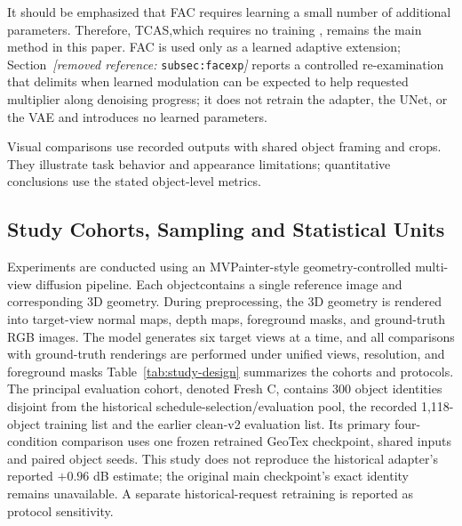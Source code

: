 \documentclass[times,twocolumn,final]{elsarticle}
\providecommand{\DIFadd}[1]{{\protect\color{blue} \sf #1}} %
\providecommand{\DIFdel}[1]{{\protect\color{red} \scriptsize #1}} %
\providecommand{\DIFaddbegin}{} %
\providecommand{\DIFaddend}{} %
\providecommand{\DIFdelbegin}{} %
\providecommand{\DIFdelend}{} %
\begin{document}
\DIFdel{It should be emphasized that FAC requires learning a small number of additional parameters. Therefore, TCAS,which requires no training , remains the main method in this paper. FAC is used only as a learned adaptive extension; Section~\textit{[removed reference: }\texttt{subsec:facexp}\textit{]} reports a controlled re-examination that delimits when learned modulation can be expected to help}\DIFdelend \DIFaddbegin \DIFadd{requested multiplier along denoising progress; it does not retrain the adapter, the UNet, or the VAE and introduces no learned parameters}\DIFaddend .

\DIFdelbegin %
\DIFdelend \DIFaddbegin \DIFadd{Visual comparisons use recorded outputs with shared object framing and crops. They illustrate task behavior and appearance limitations; quantitative conclusions use the stated object-level metrics.
}\DIFaddend 

\DIFdelbegin %
\DIFdelend \DIFaddbegin \subsection{Study Cohorts, Sampling and Statistical Units}
\DIFaddend \label{subsec:setup}

\DIFdelbegin %

\DIFdel{Experiments are conducted using an MVPainter-style geometry-controlled multi-view diffusion pipeline. Each objectcontains a single reference image and corresponding 3D geometry. During preprocessing, the 3D geometry is rendered into target-view normal maps, depth maps, foreground masks, and ground-truth RGB images. The model generates six target views at a time, and all comparisons with ground-truth renderings are performed under unified views, resolution, and foreground masks}\DIFdelend \DIFaddbegin \DIFadd{Table~\ref{tab:study-design} summarizes the cohorts and protocols. The principal evaluation cohort, denoted Fresh C, contains 300 object identities disjoint from the historical schedule-selection/evaluation pool, the recorded 1,118-object training list and the earlier clean-v2 evaluation list. Its primary four-condition comparison uses one frozen retrained GeoTex checkpoint, shared inputs and paired object seeds. This study does not reproduce the historical adapter's reported $+0.96$ dB estimate; the original main checkpoint's exact identity remains unavailable. A separate historical-request retraining is reported as protocol sensitivity}\DIFaddend .
\end{document}

